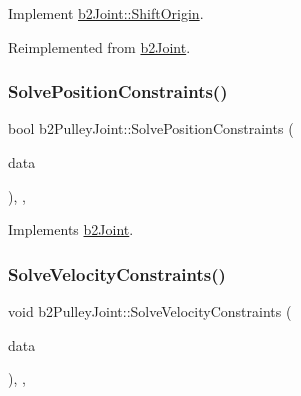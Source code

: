 Implement \mbox{\hyperlink{classb2_joint_a7804f649e993dc0fd9ae47fde5601f90}{b2\+Joint\+::\+Shift\+Origin}}. 



Reimplemented from \mbox{\hyperlink{classb2_joint_a7804f649e993dc0fd9ae47fde5601f90}{b2\+Joint}}.

\mbox{\label{classb2_pulley_joint_ac3d5f78f3bdd248ca368add8f21b7e95}} 
\subsubsection{\texorpdfstring{SolvePositionConstraints()}{SolvePositionConstraints()}}
{\footnotesize\ttfamily bool b2\+Pulley\+Joint\+::\+Solve\+Position\+Constraints (\begin{DoxyParamCaption}\item[{const \mbox{\hyperlink{structb2_solver_data}{b2\+Solver\+Data}} \&}]{data }\end{DoxyParamCaption})\hspace{0.3cm}{\ttfamily [override]}, {\ttfamily [protected]}, {\ttfamily [virtual]}}



Implements \mbox{\hyperlink{classb2_joint_af767ac9aa494bd15cdf83dfe3e487d9c}{b2\+Joint}}.

\mbox{\label{classb2_pulley_joint_a80de874e392a8238fd2e965f5080222b}} 
\subsubsection{\texorpdfstring{SolveVelocityConstraints()}{SolveVelocityConstraints()}}
{\footnotesize\ttfamily void b2\+Pulley\+Joint\+::\+Solve\+Velocity\+Constraints (\begin{DoxyParamCaption}\item[{const \mbox{\hyperlink{structb2_solver_data}{b2\+Solver\+Data}} \&}]{data }\end{DoxyParamCaption})\hspace{0.3cm}{\ttfamily [override]}, {\ttfamily [protected]}, {\ttfamily [virtual]}}



